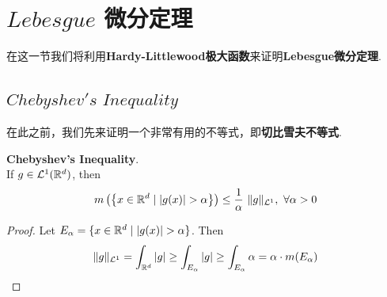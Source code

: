 \newpage
\section{$Lebesgue$ 微分定理}
	\begin{center}
		在这一节我们将利用\textbf{Hardy-Littlewood极大函数}来证明\textbf{Lebesgue微分定理}.
	\end{center}
	
\subsection{$Chebyshev's \,\, Inequality$}
	在此之前，我们先来证明一个非常有用的不等式，即\textbf{切比雪夫不等式}.
	\begin{thm}\label{thm 4.2.1}
		\textbf{Chebyshev's Inequality}. \\
		If $g \in \mathcal{L}^{1}(\mathbb{R}^d)$, then
		\begin{align}
			m\left( \left\{ x \in \mathbb{R}^d \mid \left| g(x) \right| > \alpha \right\} \right)
			\leq \frac{1}{\alpha} \,\, \Vert g \Vert_{\mathcal{L}^1} , \,\, \forall \alpha > 0
		\end{align}
		
		\vspace{4em}
		\begin{proof}
			Let $E_\alpha = \{ x \in \mathbb{R}^d \mid \left| g(x) \right| > \alpha \}$. Then
			\begin{align}
				\Vert g \Vert_{\mathcal{L}^1}
				= \int_{\mathbb{R}^d}{\left| g \right|}
				\geq \int_{E_\alpha}{\left| g \right|}
				\geq \int_{E_\alpha}{\alpha}
				= \alpha \cdot m(E_\alpha)
			\end{align}
		\end{proof}
	\end{thm}

\newpage
